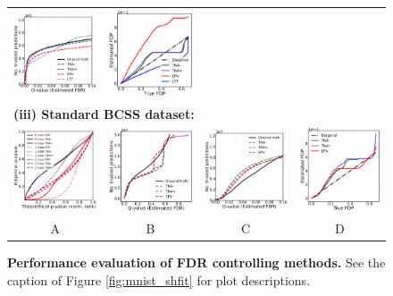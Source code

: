 \documentclass{article}
\begin{document}
\begin{figure}
\begin{tabular}{cccc}
		\includegraphics[width=0.225\linewidth, height=0.225\linewidth]{img/cnn_cells_balanced_fdr_control_loc.png} & 
		\includegraphics[width=0.225\linewidth, height=0.225\linewidth]{img/cnn_FDPscat_cells_balanced.png}\\			
		\multicolumn{4}{l}{\bf (iii) Standard BCSS dataset:}\\		
		\includegraphics[width=0.225\linewidth, height=0.225\linewidth]{img/cnn_QQ_bcss.png} &
		\includegraphics[width=0.225\linewidth, height=0.225\linewidth]{img/cnn_bcss_fdr_control.png} &
		\includegraphics[width=0.225\linewidth, height=0.225\linewidth]{img/cnn_bcss_fdr_control_loc.png}  &
		\includegraphics[width=0.225\linewidth, height=0.225\linewidth]{img/cnn_FDPscat_bcss.png}\\
		A & B & C & D
	\end{tabular}
	\caption{{\bf Performance evaluation of FDR controlling methods.}  See the caption of Figure \ref{fig:mnist_shfit} for plot descriptions.}
	\label{fig:ii}
\end{figure} 
\end{document}
